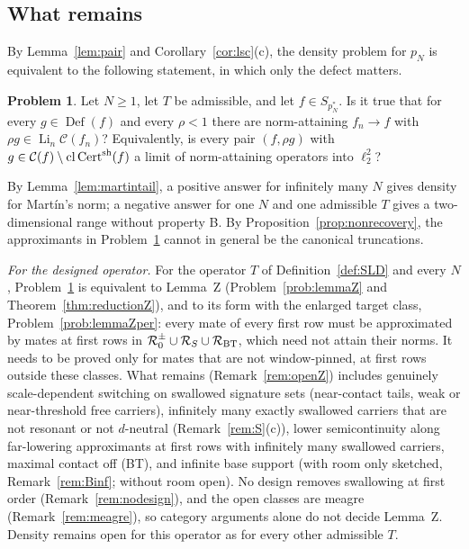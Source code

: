 \documentclass[10pt]{amsart}
\theoremstyle{definition}
\newtheorem{problem}[theorem]{Problem}
\theoremstyle{remark}
\newcommand{\Cset}{\mathcal C}
\newcommand{\Cert}{\operatorname{Cert}}
\newcommand{\Li}{\operatorname*{Li}}
\newcommand{\cl}{\operatorname{cl}}
\newcommand{\Def}{\operatorname{Def}}
\begin{document}
\subsection{What remains}
By Lemma~\ref{lem:pair} and Corollary~\ref{cor:lsc}(c), the density problem
for $p_N$ is equivalent to the following statement, in which only the defect
matters.

\begin{problem}\label{prob:main}
Let $N\ge1$, let $T$ be admissible, and let $f\in S_{p_N^*}$.  Is it true
that for every $g\in\Def(f)$ and every $\rho<1$ there are norm-attaining
$f_n\to f$ with $\rho g\in\Li_n\Cset(f_n)$?  Equivalently, is every pair
$(f,\rho g)$ with $g\in\Cset(f)\setminus\cl\Cert^{\rm sh}(f)$ a limit of
norm-attaining operators into $\ell_2^2$?
\end{problem}

By Lemma~\ref{lem:martintail}, a positive answer for infinitely many $N$
gives density for Mart\'in's norm; a negative answer for one $N$ and one
admissible $T$ gives a two-dimensional range without property B.  By
Proposition~\ref{prop:nonrecovery}, the approximants in
Problem~\ref{prob:main} cannot in general be the canonical truncations.

\emph{For the designed operator.}  For the operator $T$ of
Definition~\ref{def:SLD} and every $N$, Problem~\ref{prob:main} is
equivalent to Lemma~Z (Problem~\ref{prob:lemmaZ} and
Theorem~\ref{thm:reductionZ}), and to its form with the enlarged target
class, Problem~\ref{prob:lemmaZper}: every mate of every first row must be
approximated by mates at first rows in $\mathcal R_0^\pm\cup\mathcal
R_S\cup\mathcal R_{\rm BT}$, which need not attain their norms.  It needs
to be proved only for mates that are not window-pinned, at first rows
outside these classes.  What remains (Remark~\ref{rem:openZ}) includes
genuinely scale-dependent switching on swallowed signature sets
(near-contact tails, weak or near-threshold free carriers), infinitely
many exactly swallowed carriers that are not resonant or not $d$-neutral
(Remark~\ref{rem:S}(c)), lower
semicontinuity along far-lowering approximants at first rows with
infinitely many swallowed carriers, maximal contact off \textup{(BT)}, and
infinite base support (with room only sketched, Remark~\ref{rem:Binf};
without room open).  No design removes swallowing at
first order (Remark~\ref{rem:nodesign}), and the open classes are meagre
(Remark~\ref{rem:meagre}), so category arguments alone do not decide
Lemma~Z.  Density remains open for this operator as for every other
admissible $T$.
\end{document}
